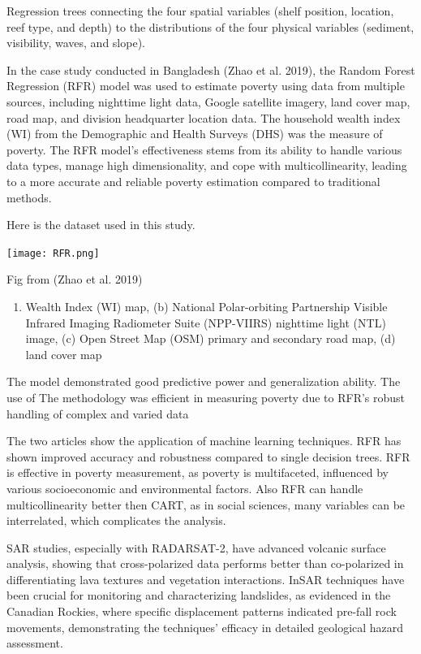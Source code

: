 \documentclass[
  letterpaper,
  DIV=11,
  numbers=noendperiod]{scrreprt}
\providecommand{\tightlist}{%
  \setlength{\itemsep}{0pt}\setlength{\parskip}{0pt}}\usepackage{longtable,booktabs,array}
\begin{document}
Regression trees connecting the four spatial variables (shelf position,
location, reef type, and depth) to the distributions of the four
physical variables (sediment, visibility, waves, and slope).

In the case study conducted in Bangladesh (Zhao et al. 2019), the Random
Forest Regression (RFR) model was used to estimate poverty using data
from multiple sources, including nighttime light data, Google satellite
imagery, land cover map, road map, and division headquarter location
data. The household wealth index (WI) from the Demographic and Health
Surveys (DHS) was the measure of poverty. The RFR model's effectiveness
stems from its ability to handle various data types, manage high
dimensionality, and cope with multicollinearity, leading to a more
accurate and reliable poverty estimation compared to traditional
methods.

Here is the dataset used in this study.

\texttt{[image: RFR.png]}

Fig from (Zhao et al. 2019)

\begin{enumerate}
\def\labelenumi{(\alph{enumi})}
\tightlist
\item
  Wealth Index (WI) map, (b) National Polar-orbiting Partnership Visible
  Infrared Imaging Radiometer Suite (NPP-VIIRS) nighttime light (NTL)
  image, (c) Open Street Map (OSM) primary and secondary road map, (d)
  land cover map
\end{enumerate}

The model demonstrated good predictive power and generalization ability.
The use of The methodology was efficient in measuring poverty due to
RFR's robust handling of complex and varied data

The two articles show the application of machine learning techniques.
RFR has shown improved accuracy and robustness compared to single
decision trees. RFR is effective in poverty measurement, as poverty is
multifaceted, influenced by various socioeconomic and environmental
factors. Also RFR can handle multicollinearity better then CART, as in
social sciences, many variables can be interrelated, which complicates
the analysis.

SAR studies, especially with RADARSAT-2, have advanced volcanic surface
analysis, showing that cross-polarized data performs better than
co-polarized in differentiating lava textures and vegetation
interactions. InSAR techniques have been crucial for monitoring and
characterizing landslides, as evidenced in the Canadian Rockies, where
specific displacement patterns indicated pre-fall rock movements,
demonstrating the techniques' efficacy in detailed geological hazard
assessment.
\end{document}
